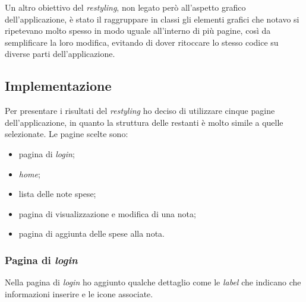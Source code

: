 \noindent Un altro obiettivo del \textit{restyling}, non legato però all'aspetto grafico dell'applicazione, è stato il raggruppare in classi gli elementi grafici che notavo si ripetevano molto spesso in modo uguale all'interno di più pagine, così da semplificare la loro modifica, evitando di dover ritoccare lo stesso codice su diverse parti dell'applicazione.

\subsection{Implementazione}

Per presentare i risultati del \textit{restyling} ho deciso di utilizzare cinque pagine dell'applicazione, in quanto la struttura delle restanti è molto simile a quelle selezionate. Le pagine scelte sono:
\begin{itemize}
    \item pagina di \textit{login};
    \item \textit{home};
    \item lista delle note spese;
    \item pagina di visualizzazione e modifica di una nota;
    \item pagina di aggiunta delle spese alla nota.
\end{itemize}

\subsubsection{Pagina di \textit{login}}

Nella pagina di \textit{login} ho aggiunto qualche dettaglio come le \textit{label} che indicano che informazioni inserire e le icone associate.

